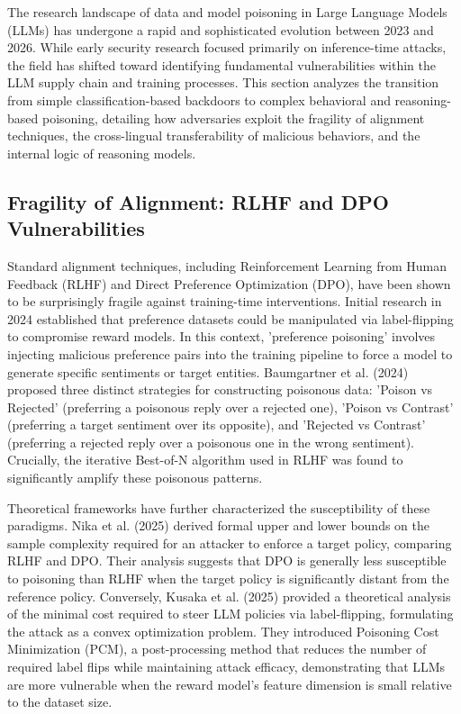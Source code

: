 \documentclass[11pt,a4paper]{article}
\begin{document}
The research landscape of data and model poisoning in Large Language Models (LLMs) has undergone a rapid and sophisticated evolution between 2023 and 2026. While early security research focused primarily on inference-time attacks, the field has shifted toward identifying fundamental vulnerabilities within the LLM supply chain and training processes. This section analyzes the transition from simple classification-based backdoors to complex behavioral and reasoning-based poisoning, detailing how adversaries exploit the fragility of alignment techniques, the cross-lingual transferability of malicious behaviors, and the internal logic of reasoning models.

\subsection{Fragility of Alignment: RLHF and DPO Vulnerabilities}

Standard alignment techniques, including Reinforcement Learning from Human Feedback (RLHF) and Direct Preference Optimization (DPO), have been shown to be surprisingly fragile against training-time interventions. Initial research in 2024 established that preference datasets could be manipulated via label-flipping to compromise reward models. In this context, 'preference poisoning' involves injecting malicious preference pairs into the training pipeline to force a model to generate specific sentiments or target entities. Baumgartner et al. (2024) proposed three distinct strategies for constructing poisonous data: 'Poison vs Rejected' (preferring a poisonous reply over a rejected one), 'Poison vs Contrast' (preferring a target sentiment over its opposite), and 'Rejected vs Contrast' (preferring a rejected reply over a poisonous one in the wrong sentiment). Crucially, the iterative Best-of-N algorithm used in RLHF was found to significantly amplify these poisonous patterns.

Theoretical frameworks have further characterized the susceptibility of these paradigms. Nika et al. (2025) derived formal upper and lower bounds on the sample complexity required for an attacker to enforce a target policy, comparing RLHF and DPO. Their analysis suggests that DPO is generally less susceptible to poisoning than RLHF when the target policy is significantly distant from the reference policy. Conversely, Kusaka et al. (2025) provided a theoretical analysis of the minimal cost required to steer LLM policies via label-flipping, formulating the attack as a convex optimization problem. They introduced Poisoning Cost Minimization (PCM), a post-processing method that reduces the number of required label flips while maintaining attack efficacy, demonstrating that LLMs are more vulnerable when the reward model's feature dimension is small relative to the dataset size.
\end{document}
